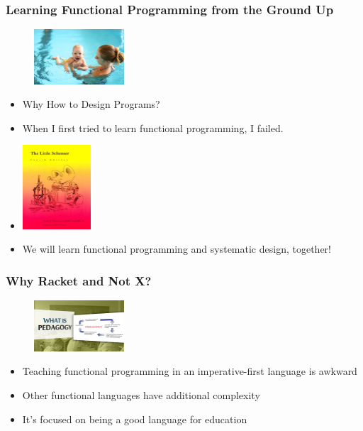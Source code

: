 \documentclass{beamer}
\begin{document}
\begin{frame}
  \frametitle{Learning Functional Programming from the Ground Up}
  \begin{figure}[t]
    \centering \includegraphics[width=0.3\textwidth]{images/pool-baby.jpeg}
  \end{figure}
  \begin{itemize}
  \item<2-> Why How to Design Programs?
  \item<3-> When I first tried to learn functional programming, I failed.
  \item<4-> \includegraphics[width=0.2\textwidth]{images/little-schemer.jpg}
  \item<5-> We will learn functional programming and systematic design, together!
  \end{itemize}  
\end{frame}

\begin{frame}
  \frametitle{Why Racket and Not X?}
  \begin{figure}[t]
    \centering \includegraphics[width=0.3\textwidth]{images/pedagogy.jpg}
  \end{figure}
  \begin{itemize}
    \item<2-> Teaching functional programming in an imperative-first language is awkward
    \item<3-> Other functional languages have additional complexity
    \item<4-> It's focused on being a good language for education
  \end{itemize}
\end{frame}
\end{document}
